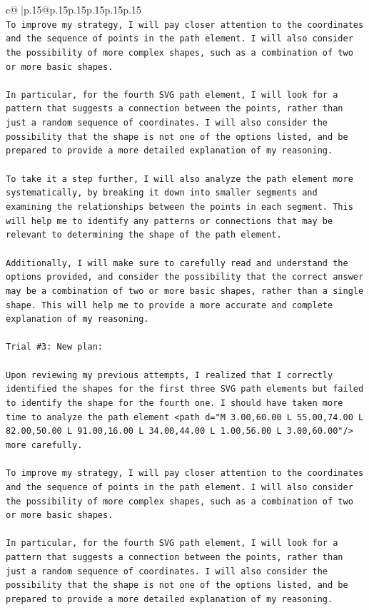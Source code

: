 \documentclass{article}
\begin{document}
{\begin{supertabular}{c@{$\;$}|p{.15\linewidth}@{}p{.15\linewidth}p{.15\linewidth}p{.15\linewidth}p{.15\linewidth}p{.15\linewidth}}
{{{\\ 
\texttt{To improve my strategy, I will pay closer attention to the coordinates and the sequence of points in the path element. I will also consider the possibility of more complex shapes, such as a combination of two or more basic shapes. } \\
\\ 
\texttt{In particular, for the fourth SVG path element, I will look for a pattern that suggests a connection between the points, rather than just a random sequence of coordinates. I will also consider the possibility that the shape is not one of the options listed, and be prepared to provide a more detailed explanation of my reasoning.} \\
\\ 
\texttt{To take it a step further, I will also analyze the path element more systematically, by breaking it down into smaller segments and examining the relationships between the points in each segment. This will help me to identify any patterns or connections that may be relevant to determining the shape of the path element.} \\
\\ 
\texttt{Additionally, I will make sure to carefully read and understand the options provided, and consider the possibility that the correct answer may be a combination of two or more basic shapes, rather than a single shape. This will help me to provide a more accurate and complete explanation of my reasoning.} \\
\\ 
\texttt{Trial \#3: New plan: } \\
\\ 
\texttt{Upon reviewing my previous attempts, I realized that I correctly identified the shapes for the first three SVG path elements but failed to identify the shape for the fourth one. I should have taken more time to analyze the path element <path d="M 3.00,60.00 L 55.00,74.00 L 82.00,50.00 L 91.00,16.00 L 34.00,44.00 L 1.00,56.00 L 3.00,60.00"/> more carefully. } \\
\\ 
\texttt{To improve my strategy, I will pay closer attention to the coordinates and the sequence of points in the path element. I will also consider the possibility of more complex shapes, such as a combination of two or more basic shapes. } \\
\\ 
\texttt{In particular, for the fourth SVG path element, I will look for a pattern that suggests a connection between the points, rather than just a random sequence of coordinates. I will also consider the possibility that the shape is not one of the options listed, and be prepared to provide a more detailed explanation of my reasoning.} \\
}}}
\end{supertabular}}
\end{document}
